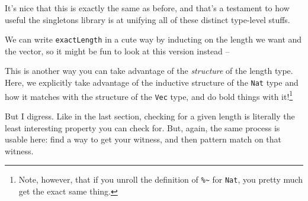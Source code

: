 \documentclass[]{article}
\newenvironment{Shaded}{}{}
\newcommand{\KeywordTok}[1]{\textcolor[rgb]{0.00,0.44,0.13}{\textbf{#1}}}
\newcommand{\DataTypeTok}[1]{\textcolor[rgb]{0.56,0.13,0.00}{#1}}
\newcommand{\CommentTok}[1]{\textcolor[rgb]{0.38,0.63,0.69}{\textit{#1}}}
\newcommand{\OtherTok}[1]{\textcolor[rgb]{0.00,0.44,0.13}{#1}}
\newcommand{\FunctionTok}[1]{\textcolor[rgb]{0.02,0.16,0.49}{#1}}
\newcommand{\NormalTok}[1]{#1}
\begin{document}
It's nice that this is exactly the same as before, and that's a testament to how
useful the singletons library is at unifying all of these distinct type-level
stuffs.

We can write \texttt{exactLength} in a cute way by inducting on the length we
want and the vector, so it might be fun to look at this version instead --

\begin{Shaded}
\end{Shaded}

This is another way you can take advantage of the \emph{structure} of the length
type. Here, we explicitly take advantage of the inductive structure of the
\texttt{Nat} type and how it matches with the structure of the \texttt{Vec}
type, and do bold things with it!\footnote{Note, however, that if you unroll the
  definition of \texttt{\%\textasciitilde{}} for \texttt{Nat}, you pretty much
  get the exact same thing.}

But I digress. Like in the last section, checking for a given length is
literally the least interesting property you can check for. But, again, the same
process is usable here: find a way to get your witness, and then pattern match
on that witness.
\end{document}
